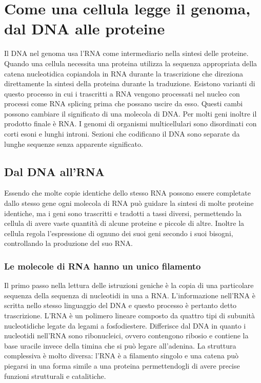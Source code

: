 \chapter{Come una cellula legge il genoma, dal DNA alle proteine}
Il DNA nel genoma usa l'RNA come intermediario nella sintesi delle proteine. Quando una cellula necessita una proteina utilizza la sequenza appropriata della catena nucleotidica 
copiandola in RNA durante la trascrizione che direziona direttamente la sintesi della proteina durante la traduzione. Esistono varianti di questo processo in cui i trascritti a RNA 
vengono processati nel nucleo con processi come RNA splicing prima che possano uscire da esso. Questi cambi possono cambiare il significato di una molecola di DNA. Per molti geni inoltre
il prodotto finale \`e RNA. I genomi di organismi multicellulari sono disordinati con corti esoni e lunghi introni. Sezioni che codificano il DNA sono separate da lunghe sequenze senza 
apparente significato. 
\section{Dal DNA all'RNA}
Essendo che molte copie identiche dello stesso RNA possono essere completate dallo stesso gene ogni molecola di RNA pu\`o guidare la sintesi di molte proteine identiche, ma i geni sono
trascritti e tradotti a tassi diversi, permettendo la cellula di avere vaste quantit\`a di alcune proteine e piccole di altre. Inoltre la cellula regola l'espressione di ognuno dei suoi
geni secondo i suoi bisogni, controllando la produzione del suo RNA.
\subsection{Le molecole di RNA hanno un unico filamento}
Il primo passo nella lettura delle istruzioni geniche \`e la copia di una particolare sequenza della sequenza di nucleotidi in una a RNA. L'informazione nell'RNA \`e scritta nello stesso
linguaggio del DNA e questo processo \`e pertanto detto trascrizione. L'RNA \`e un polimero lineare composto da quattro tipi di subunit\`a nucleotidiche legate da legami a fosfodiestere.
Differisce dal DNA in quanto i nucleotidi nell'RNA sono ribonucleici, ovvero contengono ribosio e contiene la base uracile invece della timina che si pu\`o legare all'adenina. La
struttura complessiva \`e molto diversa: l'RNA \`e a filamento singolo e una catena pu\`o piegarsi in una forma simile a una proteina permettendogli di avere precise funzioni strutturali
e catalitiche.
